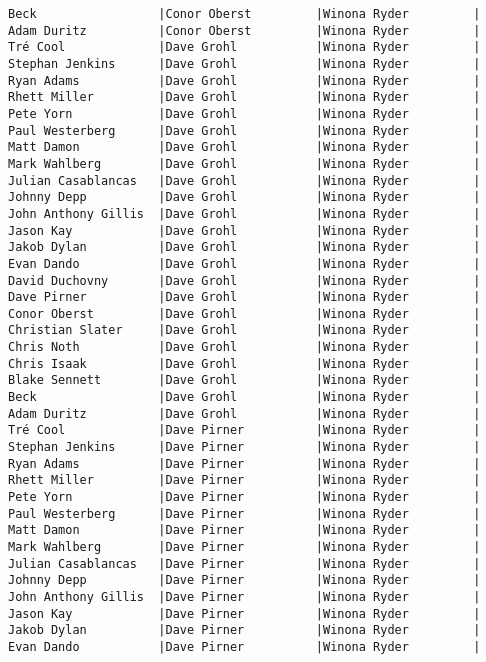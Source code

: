 \documentclass{article}
\begin{document}
\begin{verbatim}
Beck                 |Conor Oberst         |Winona Ryder         |
Adam Duritz          |Conor Oberst         |Winona Ryder         |
Tré Cool             |Dave Grohl           |Winona Ryder         |
Stephan Jenkins      |Dave Grohl           |Winona Ryder         |
Ryan Adams           |Dave Grohl           |Winona Ryder         |
Rhett Miller         |Dave Grohl           |Winona Ryder         |
Pete Yorn            |Dave Grohl           |Winona Ryder         |
Paul Westerberg      |Dave Grohl           |Winona Ryder         |
Matt Damon           |Dave Grohl           |Winona Ryder         |
Mark Wahlberg        |Dave Grohl           |Winona Ryder         |
Julian Casablancas   |Dave Grohl           |Winona Ryder         |
Johnny Depp          |Dave Grohl           |Winona Ryder         |
John Anthony Gillis  |Dave Grohl           |Winona Ryder         |
Jason Kay            |Dave Grohl           |Winona Ryder         |
Jakob Dylan          |Dave Grohl           |Winona Ryder         |
Evan Dando           |Dave Grohl           |Winona Ryder         |
David Duchovny       |Dave Grohl           |Winona Ryder         |
Dave Pirner          |Dave Grohl           |Winona Ryder         |
Conor Oberst         |Dave Grohl           |Winona Ryder         |
Christian Slater     |Dave Grohl           |Winona Ryder         |
Chris Noth           |Dave Grohl           |Winona Ryder         |
Chris Isaak          |Dave Grohl           |Winona Ryder         |
Blake Sennett        |Dave Grohl           |Winona Ryder         |
Beck                 |Dave Grohl           |Winona Ryder         |
Adam Duritz          |Dave Grohl           |Winona Ryder         |
Tré Cool             |Dave Pirner          |Winona Ryder         |
Stephan Jenkins      |Dave Pirner          |Winona Ryder         |
Ryan Adams           |Dave Pirner          |Winona Ryder         |
Rhett Miller         |Dave Pirner          |Winona Ryder         |
Pete Yorn            |Dave Pirner          |Winona Ryder         |
Paul Westerberg      |Dave Pirner          |Winona Ryder         |
Matt Damon           |Dave Pirner          |Winona Ryder         |
Mark Wahlberg        |Dave Pirner          |Winona Ryder         |
Julian Casablancas   |Dave Pirner          |Winona Ryder         |
Johnny Depp          |Dave Pirner          |Winona Ryder         |
John Anthony Gillis  |Dave Pirner          |Winona Ryder         |
Jason Kay            |Dave Pirner          |Winona Ryder         |
Jakob Dylan          |Dave Pirner          |Winona Ryder         |
Evan Dando           |Dave Pirner          |Winona Ryder         |

\end{verbatim}
\end{document}

